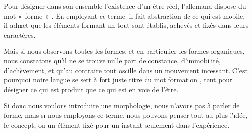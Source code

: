 \documentclass[11pt,twoside,openany]{book}
\newenvironment{lateiDocument}{}{}
\begin{document}
\begin{lateiDocument}
\begin{teiElement}[name={TEI},change={commons\_edition}]
\begin{teiElement}[name={text},type={book},xmlid={book}]
\begin{teiElement}[name={group},type={book},xmlid={book-001}]
\begin{teiElement}[name={group},type={section1},xmlid={section1-002}]
\begin{teiElement}
\begin{teiElement}[name={body},xmlid={body-006}]
\begin{teiCit}[xmlid={cit02-4}]
              \begin{teiQuote}
Pour désigner dans son ensemble l’existence d’un être réel, l’allemand dispose du mot « forme » \lbrack{}\rbrack{}. En employant ce terme, il fait abstraction de ce qui est mobile, il admet que les éléments formant un tout sont établis, achevés et fixés dans leurs caractères.
\end{teiQuote}
            
\end{teiCit}
            \begin{teiCit}[xmlid={cit03-4}]

              \begin{teiQuote}
Mais si nous observons toutes les formes, et en particulier les formes organiques, nous constatons qu’il ne se trouve nulle part de constance, d’immobilité, d’achèvement, et qu’au contraire tout oscille dans un mouvement incessant. C’est pourquoi notre langue se sert à fort juste titre du mot formation \lbrack{}\rbrack{}, tant pour désigner ce qui est produit que ce qui est en voie de l’être.
\end{teiQuote}
            
\end{teiCit}
            \begin{teiCit}[xmlid={cit04-4}]

              \begin{teiQuote}
Si donc nous voulons introduire une morphologie, nous n’avons pas à parler de forme, mais si nous employons ce terme, nous pouvons penser tout au plus l’idée, le concept, ou un élément fixé pour un instant seulement dans l’expérience.
\end{teiQuote}
            

\end{teiCit}
\end{teiElement}
\end{teiElement}
\end{teiElement}
\end{teiElement}
\end{teiElement}
\end{teiElement}
\end{lateiDocument}
\end{document}
